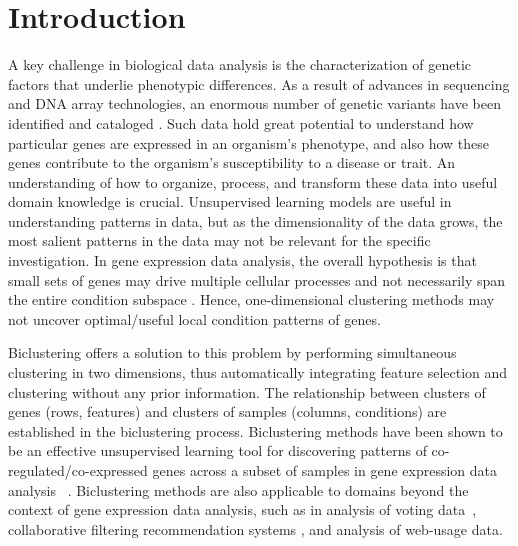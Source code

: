 \section{Introduction}
\label{sec:introduction}
A key challenge in biological data analysis is the characterization of genetic factors that underlie phenotypic differences. 
As a result of advances in sequencing and DNA array technologies, an enormous number of genetic variants have been identified and cataloged \cite{xia2015networkanalyst}.
Such data hold great potential to understand how particular genes are expressed in an organism's phenotype, and also how these genes contribute to the organism's susceptibility to a disease or trait.
An understanding of how to organize, process, and transform these data into useful domain knowledge is crucial.
Unsupervised learning models are useful in understanding patterns in data, but as the dimensionality of the data grows, the most salient patterns in the data may not be relevant for the specific investigation.
In gene expression data analysis, the overall hypothesis is that small sets of genes may drive multiple cellular processes and not necessarily span the entire condition subspace \cite{xu2011bartmap}.
Hence, one-dimensional clustering methods may not uncover optimal/useful local condition patterns of genes.

Biclustering offers a solution to this problem by performing simultaneous clustering in two dimensions, thus automatically integrating feature selection and clustering without any prior information.
The relationship between clusters of genes (rows, features) and clusters of samples (columns, conditions) are established in the biclustering process.
Biclustering methods have been shown to be an effective unsupervised learning tool for discovering patterns of co-regulated/co-expressed genes across a subset of samples in gene expression data analysis ~\cite{tanay2002discovering,madeira2004biclustering,pontes2015biclustering}.
Biclustering methods are also applicable to domains beyond the context of gene expression data analysis, such as in analysis of voting data~\cite{hartigan1972direct}, collaborative filtering recommendation systems \cite{elnabarawy2016biclustering}, and analysis of web-usage data\cite{prabha2013biclustering}.

